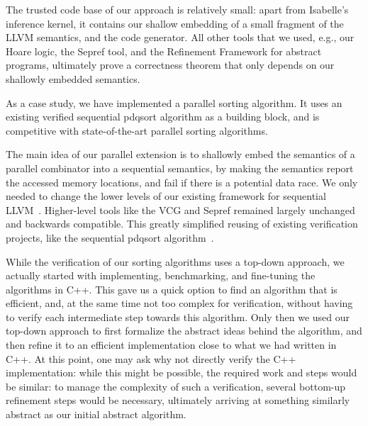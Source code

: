 \documentclass[sn-mathphys,Numbered]{sn-jnl}
\theoremstyle{thmstyleone}%
\theoremstyle{definition}%
\theoremstyle{thmstylethree}%
\begin{document}
    The trusted code base of our approach is relatively small:
    apart from Isabelle's inference kernel, it contains our shallow embedding of a small fragment of
    the LLVM semantics, and the code generator.
    All other tools that we used, e.g., our Hoare logic, the Sepref tool, and the Refinement Framework for abstract programs,
    ultimately prove a correctness theorem that only depends on our shallowly embedded semantics.

    As a case study, we have implemented a parallel sorting algorithm.
    It uses an existing verified sequential pdqsort algorithm as a building block,
    and is competitive with state-of-the-art parallel sorting algorithms.

    The main idea of our parallel extension is to shallowly embed the semantics of a
    parallel combinator into a sequential semantics, by making the
    semantics report the accessed memory locations, and fail if there is a potential data race.
    We only needed to change the lower levels of our existing framework for sequential LLVM~\cite{La19-llvm}.
    Higher-level tools like the VCG and Sepref remained largely unchanged and backwards compatible.
    This greatly simplified reusing of existing verification projects, like the sequential pdqsort algorithm~\cite{La20}.

    While the verification of our sorting algorithms uses a top-down approach, we actually started with
    implementing, benchmarking, and fine-tuning the algorithms in C++. This gave us a quick option to
    find an algorithm that is efficient, and, at the same time not too complex for verification,
    without having to verify each intermediate step towards this algorithm.
    Only then we used our top-down approach to first formalize the abstract ideas behind the algorithm,
    and then refine it to an efficient implementation close to what we had written in C++.
    At this point, one may ask why not directly verify the C++ implementation: while this might be
    possible, the required work and steps would be similar: to manage the complexity of such a verification,
    several bottom-up refinement steps would be necessary, ultimately arriving at something similarly abstract
    as our initial abstract algorithm.

%
%
%
%
%
%
%
\end{document}
